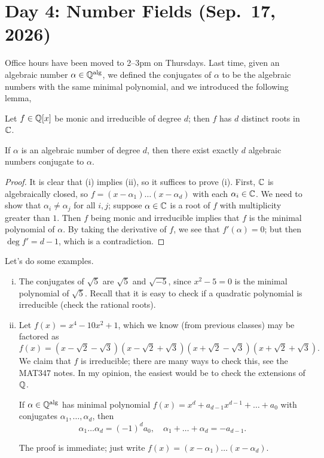 \section{Day 4: Number Fields (Sep.\ 17, 2026)}
Office hours have been moved to 2--3pm on Thursdays. Last time, given an algebraic number $\alpha \in \operatorname{\mathbb Q^{\operatorname{alg}}}$, we defined the conjugates of $\alpha$ to be the algebraic numbers with the same minimal polynomial, and we introduced the following lemma,
\begin{lemma}
    \begin{parlist}
        \item Let $f \in \mathbb Q[x]$ be monic and irreducible of degree $d$; then $f$ has $d$ distinct roots in $\mathbb C$.
        \item If $\alpha$ is an algebraic number of degree $d$, then there exist exactly $d$ algebraic numbers conjugate to $\alpha$.
    \end{parlist}
\end{lemma}
\begin{proof}
    It is clear that (i) implies (ii), so it suffices to prove (i). First, $\mathbb C$ is algebraically closed, so $f = (x - \alpha_1) \dots (x - \alpha_d)$ with each $\alpha_i \in \mathbb C$. We need to show that $\alpha_i \neq \alpha_j$ for all $i, j$; suppose $\alpha \in \mathbb C$ is a root of $f$ with multiplicity greater than $1$. Then $f$ being monic and irreducible implies that $f$ is the minimal polynomial of $\alpha$. By taking the derivative of $f$, we see that $f'(\alpha) = 0$; but then $\deg f' = d - 1$, which is a contradiction.
\end{proof}

Let's do some examples.
\begin{enumerate}[(i)]
    \item The conjugates of $\sqrt{5}$ are $\sqrt{5}$ and $\sqrt{-5}$, since $x^2 - 5 = 0$ is the minimal polynomial of $\sqrt{5}$. Recall that it is easy to check if a quadratic polynomial is irreducible (check the rational roots).
    \item Let $f(x) = x^4 - 10x^2 + 1$, which we know (from previous classes) may be factored as
    \[ f(x) = (x - \sqrt{2} - \sqrt{3})(x - \sqrt{2} + \sqrt{3})(x + \sqrt{2} - \sqrt{3})(x + \sqrt{2} + \sqrt{3}). \]
    We claim that $f$ is irreducible; there are many ways to check this, see the MAT347 notes. {\color{airforceblue} In my opinion, the easiest would be to check the extensions of $\mathbb Q$.}
    \begin{corollary}[Vi\`ete] \label{cor:viete_formulas}
        If $\alpha \in \operatorname{\mathbb Q^{\operatorname{alg}}}$ has minimal polynomial $f(x) = x^d + a_{d-1} x^{d-1} + \dots + a_0$ with conjugates $\alpha_1, \dots, \alpha_d$, then 
        \[ \alpha_1 \dots \alpha_d = (-1)^d a_0, \quad \alpha_1 + \dots + \alpha_d = -a_{d-1}. \]
    \end{corollary}
    The proof is immediate; just write $f(x) = (x - \alpha_1) \dots (x - \alpha_d)$.
\end{enumerate}


